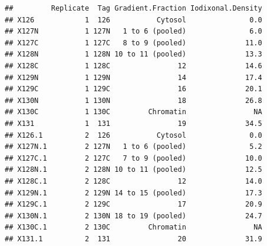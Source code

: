 \begin{knitrout}
\color{fgcolor}\begin{kframe}
\begin{alltt}
 \hlkwb{<-}   \hlstd{=} \hlstd{,}
                \hlstd{=} \hlstd{)}

 \hlkwb{<-}  \hlstd{=}\hlstd{,}  \hlstd{=} \hlstd{,}
                      \hlstd{=} \hlstd{,}  \hlstd{=} \hlstd{)}

\hlopt{$} \hlkwb{<-} \hlstd{(fracinfo[,} \hlstd{], fracinfo[,} \hlstd{])}
\hlopt{$} \hlkwb{<-} \hlstd{(fracinfo[,} \hlstd{], fracinfo[,} \hlstd{])}
\end{alltt}
\begin{verbatim}
##         Replicate  Tag Gradient.Fraction Iodixonal.Density
## X126            1  126           Cytosol               0.0
## X127N           1 127N   1 to 6 (pooled)               6.0
## X127C           1 127C   8 to 9 (pooled)              11.0
## X128N           1 128N 10 to 11 (pooled)              13.3
## X128C           1 128C                12              14.6
## X129N           1 129N                14              17.4
## X129C           1 129C                16              20.1
## X130N           1 130N                18              26.8
## X130C           1 130C         Chromatin                NA
## X131            1  131                19              34.5
## X126.1          2  126           Cytosol               0.0
## X127N.1         2 127N   1 to 6 (pooled)               5.2
## X127C.1         2 127C   7 to 9 (pooled)              10.0
## X128N.1         2 128N 10 to 11 (pooled)              12.5
## X128C.1         2 128C                12              14.0
## X129N.1         2 129N 14 to 15 (pooled)              17.3
## X129C.1         2 129C                17              20.9
## X130N.1         2 130N 18 to 19 (pooled)              24.7
## X130C.1         2 130C         Chromatin                NA
## X131.1          2  131                20              31.9
\end{verbatim}
\end{kframe}
\end{knitrout}

